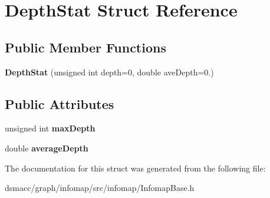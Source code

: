 \hypertarget{structDepthStat}{}\section{Depth\+Stat Struct Reference}
\label{structDepthStat}
\subsection*{Public Member Functions}
\begin{DoxyCompactItemize}
\item 
\mbox{\label{structDepthStat_ad142569b1646ed75e56fde9f23ffd7bc}} 
{\bfseries Depth\+Stat} (unsigned int depth=0, double ave\+Depth=0.)
\end{DoxyCompactItemize}
\subsection*{Public Attributes}
\begin{DoxyCompactItemize}
\item 
\mbox{\label{structDepthStat_accc2a1686ba6f2bdf2a3e46a18c7897a}} 
unsigned int {\bfseries max\+Depth}
\item 
\mbox{\label{structDepthStat_a1516bcc6b79aa679c30a58b51d791b2a}} 
double {\bfseries average\+Depth}
\end{DoxyCompactItemize}


The documentation for this struct was generated from the following file\+:\begin{DoxyCompactItemize}
\item 
dsmacc/graph/infomap/src/infomap/Infomap\+Base.\+h\end{DoxyCompactItemize}

